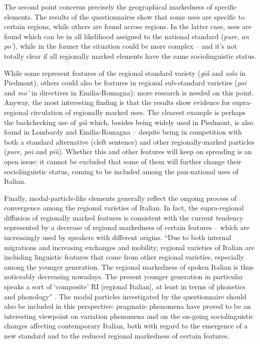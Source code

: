 The second point concerns precisely the geographical markedness of specific elements. The results of the questionnaires show that some uses are specific to certain regions, while others are found across regions. In the latter case, uses are found which can be in all likelihood assigned to the national standard (\textit{pure}, \textit{un po’}), while in the former the situation could be more complex – and it’s not totally clear if all regionally marked elements have the same sociolinguistic status.

While some represent features of the regional standard variety (\textit{già} and \textit{solo} in Piedmont), others could also be features in regional sub-standard varieties (\textit{poi} and \textit{mo’} in directives in Emilia-Romagna): more research is needed on this point. Anyway, the most interesting finding is that the results show evidence for supra-regional circulation of regionally marked uses. The clearest example is perhaps the backchecking use of \textit{già} which, besides being widely used in Piedmont, is also found in Lombardy and Emilia-Romagna – despite being in competition with both a standard alternative (cleft sentence) and other regionally-marked particles (\textit{pure}, \textit{poi} and \textit{più}). Whether this and other features will keep on spreading is an open issue: it cannot be excluded that some of them will further change their sociolinguistic status, coming to be included among the pan-national uses of Italian.

Finally, modal-particle-like elements generally reflect the ongoing process of convergence among the regional varieties of Italian. In fact, the supra-regional diffusion of regionally marked features is consistent with the current tendency represented by a decrease of regional markedness of certain features – which are increasingly used by speakers with different origins. “Due to both internal migrations and increasing exchanges and mobility, regional varieties of Italian are including linguistic features that come from other regional varieties, especially among the younger generation. The regional markedness of spoken Italian is thus noticeably decreasing nowadays. The present younger generation in particular speaks a sort of ‘composite’ RI [regional Italian], at least in terms of phonetics and phonology” \citep[23]{Cerruti2011}. The modal particles investigated by the questionnaire should also be included in this perspective: pragmatic phenomena have proved to be an interesting viewpoint on variation phenomena and on the on-going sociolinguistic changes affecting contemporary Italian, both with regard to the emergence of a new standard and to the reduced regional markedness of certain features.

